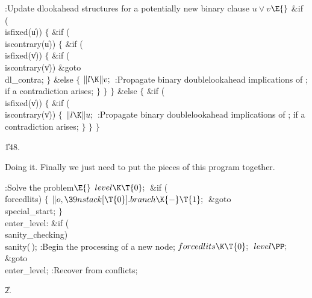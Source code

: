 \B{}:Update dlookahead structures for a potentially new
binary clause $u\lor v$\X${}\E{}$\6
\&{if} (\\{isfixed}(\|u))\5
${}\{{}$\1\6
\&{if} (\\{iscontrary}(\|u))\5
${}\{{}$\1\6
\&{if} (\\{isfixed}(\|v))\5
${}\{{}$\1\6
\&{if} (\\{iscontrary}(\|v))\1\5
\&{goto} \\{dl\_contra};\2\6
\4${}\}{}$\5
\2\&{else}\5
${}\{{}$\1\6
${}\|l\K\|v;{}$\6
:Propagate binary doublelookahead implications of ;  if a contradiction arises\X;\6
\4${}\}{}$\2\6
\4${}\}{}$\2\6
\4${}\}{}$\5
\2\&{else}\5
${}\{{}$\1\6
\&{if} (\\{isfixed}(\|v))\5
${}\{{}$\1\6
\&{if} (\\{iscontrary}(\|v))\5
${}\{{}$\1\6
${}\|l\K\|u;{}$\6
:Propagate binary doublelookahead implications of ;  if a contradiction arises\X;\6
\4${}\}{}$\2\6
\4${}\}{}$\2\6
\4${}\}{}$\2\par
\U148.\fi

Doing it. Finally we just need to put the pieces of
this program together.

\Y\B\4:Solve the problem\X${}\E{}$\6
$\\{level}\K\T{0};{}$\6
\&{if} (\\{forcedlits})\5
${}\{{}$\1\6
${}\|o,\39\\{nstack}[\T{0}].\\{branch}\K{-}\T{1};{}$\6
\&{goto} \\{special\_start};\6
\4${}\}{}$\2\6
\4\\{enter\_level}:\6
\&{if} (\\{sanity\_checking})\1\5
\\{sanity}(\,);\2\6
:Begin the processing of a new node\X;\6
${}\\{forcedlits}\K\T{0};{}$\6
${}\\{level}\PP;{}$\6
\&{goto} \\{enter\_level};\6
:Recover from conflicts\X;\par
\U2.\fi

